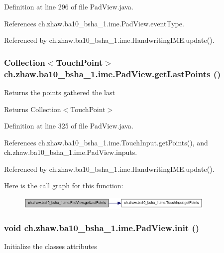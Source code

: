 Definition at line 296 of file PadView.java.

References ch.zhaw.ba10\_\-bsha\_\-1.ime.PadView.eventType.

Referenced by ch.zhaw.ba10\_\-bsha\_\-1.ime.HandwritingIME.update().\hypertarget{classch_1_1zhaw_1_1ba10__bsha__1_1_1ime_1_1PadView_aea9a4c4f77ccfdfddfad16cdcc200107}{
\subsubsection[{getLastPoints}]{\setlength{\rightskip}{0pt plus 5cm}Collection$<${\bf TouchPoint}$>$ ch.zhaw.ba10\_\-bsha\_\-1.ime.PadView.getLastPoints ()}}
\label{classch_1_1zhaw_1_1ba10__bsha__1_1_1ime_1_1PadView_aea9a4c4f77ccfdfddfad16cdcc200107}
Returns the points gathered the last

\begin{DoxyReturn}{Returns}
Collection$<$TouchPoint$>$ 
\end{DoxyReturn}


Definition at line 325 of file PadView.java.

References ch.zhaw.ba10\_\-bsha\_\-1.ime.TouchInput.getPoints(), and ch.zhaw.ba10\_\-bsha\_\-1.ime.PadView.inputs.

Referenced by ch.zhaw.ba10\_\-bsha\_\-1.ime.HandwritingIME.update().

Here is the call graph for this function:\nopagebreak
\begin{figure}[H]
\begin{center}
\leavevmode
\includegraphics[width=270pt]{classch_1_1zhaw_1_1ba10__bsha__1_1_1ime_1_1PadView_aea9a4c4f77ccfdfddfad16cdcc200107_cgraph}
\end{center}
\end{figure}
\hypertarget{classch_1_1zhaw_1_1ba10__bsha__1_1_1ime_1_1PadView_a7f6b9437957e161e9ddef40f1aff665a}{
\subsubsection[{init}]{\setlength{\rightskip}{0pt plus 5cm}void ch.zhaw.ba10\_\-bsha\_\-1.ime.PadView.init ()}}
\label{classch_1_1zhaw_1_1ba10__bsha__1_1_1ime_1_1PadView_a7f6b9437957e161e9ddef40f1aff665a}
Initialize the classes attributes 

